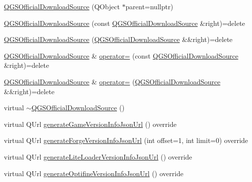 \begin{DoxyCompactItemize}
\item 
\mbox{\hyperlink{class_q_g_s_official_download_source_ad3a2fb81f27a0f73ed136e13cb357a0a}{Q\+G\+S\+Official\+Download\+Source}} (Q\+Object $\ast$parent=nullptr)
\item 
\mbox{\hyperlink{class_q_g_s_official_download_source_a91f4ed7fe2cb3ced6a88202e264ef931}{Q\+G\+S\+Official\+Download\+Source}} (const \mbox{\hyperlink{class_q_g_s_official_download_source}{Q\+G\+S\+Official\+Download\+Source}} \&right)=delete
\item 
\mbox{\hyperlink{class_q_g_s_official_download_source_a874c4e3e11b63ff84d9832dc054be1cd}{Q\+G\+S\+Official\+Download\+Source}} (\mbox{\hyperlink{class_q_g_s_official_download_source}{Q\+G\+S\+Official\+Download\+Source}} \&\&right)=delete
\item 
\mbox{\hyperlink{class_q_g_s_official_download_source}{Q\+G\+S\+Official\+Download\+Source}} \& \mbox{\hyperlink{class_q_g_s_official_download_source_a4c5c518cc098a9d14a21312b5f5b6c5a}{operator=}} (const \mbox{\hyperlink{class_q_g_s_official_download_source}{Q\+G\+S\+Official\+Download\+Source}} \&right)=delete
\item 
\mbox{\hyperlink{class_q_g_s_official_download_source}{Q\+G\+S\+Official\+Download\+Source}} \& \mbox{\hyperlink{class_q_g_s_official_download_source_a03ede2c62cf5202cf55c5a4cbd07cd31}{operator=}} (\mbox{\hyperlink{class_q_g_s_official_download_source}{Q\+G\+S\+Official\+Download\+Source}} \&\&right)=delete
\item 
virtual \mbox{\hyperlink{class_q_g_s_official_download_source_a3e3275a3fbbbe13ccea96e3bffba950d}{$\sim$\+Q\+G\+S\+Official\+Download\+Source}} ()
\item 
virtual Q\+Url \mbox{\hyperlink{class_q_g_s_official_download_source_a8a644e91bf18f28328b9b432620cca00}{generate\+Game\+Version\+Info\+Json\+Url}} () override
\item 
virtual Q\+Url \mbox{\hyperlink{class_q_g_s_official_download_source_a752fd52c76112d3d76551a00b399220f}{generate\+Forge\+Version\+Info\+Json\+Url}} (int offset=1, int limit=0) override
\item 
virtual Q\+Url \mbox{\hyperlink{class_q_g_s_official_download_source_aab46bc9decd9cb2e2fe9e9d403d36575}{generate\+Lite\+Loader\+Version\+Info\+Json\+Url}} () override
\item 
virtual Q\+Url \mbox{\hyperlink{class_q_g_s_official_download_source_a32b22d324a98de1863d1da57066f4ac1}{generate\+Optifine\+Version\+Info\+Json\+Url}} () override

\end{DoxyCompactItemize}
